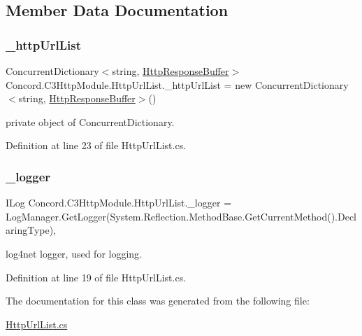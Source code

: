 \subsection{Member Data Documentation}
\mbox{\label{class_concord_1_1_c3_http_module_1_1_http_url_list_a28cb149b807e1ccecab2eb3291e07528}} 
\subsubsection{\texorpdfstring{\_httpUrlList}{\_httpUrlList}}
{\footnotesize\ttfamily Concurrent\+Dictionary$<$string, \mbox{\hyperlink{class_concord_1_1_c3_http_module_1_1_http_response_buffer}{Http\+Response\+Buffer}}$>$ Concord.\+C3\+Http\+Module.\+Http\+Url\+List.\+\_\+http\+Url\+List = new Concurrent\+Dictionary$<$string, \mbox{\hyperlink{class_concord_1_1_c3_http_module_1_1_http_response_buffer}{Http\+Response\+Buffer}}$>$()\hspace{0.3cm}{\ttfamily [private]}}



private object of Concurrent\+Dictionary. 



Definition at line 23 of file Http\+Url\+List.\+cs.

\mbox{\label{class_concord_1_1_c3_http_module_1_1_http_url_list_ae0a89d748d91a2c6bad3d66a78c11a3d}} 
\subsubsection{\texorpdfstring{\_logger}{\_logger}}
{\footnotesize\ttfamily I\+Log Concord.\+C3\+Http\+Module.\+Http\+Url\+List.\+\_\+logger = Log\+Manager.\+Get\+Logger(System.\+Reflection.\+Method\+Base.\+Get\+Current\+Method().Declaring\+Type)\hspace{0.3cm}{\ttfamily [static]}, {\ttfamily [private]}}



log4net logger, used for logging. 



Definition at line 19 of file Http\+Url\+List.\+cs.



The documentation for this class was generated from the following file\+:\begin{DoxyCompactItemize}
\item 
\mbox{\hyperlink{_http_url_list_8cs}{Http\+Url\+List.\+cs}}\end{DoxyCompactItemize}
